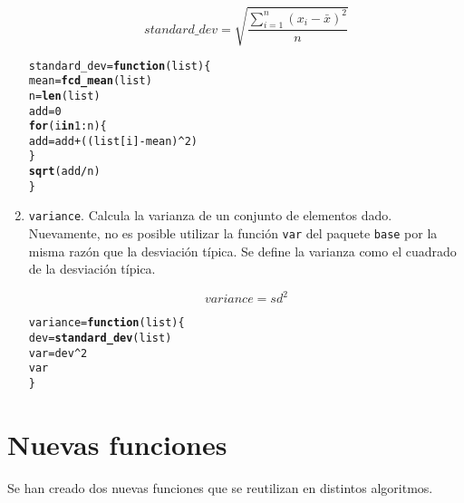 \documentclass[12pt]{report}\usepackage[]{graphicx}\usepackage[dvipsnames]{xcolor}
\makeatletter
\newcommand{\hlnum}[1]{\textcolor[rgb]{0.686,0.059,0.569}{#1}}%
\newcommand{\hlopt}[1]{\textcolor[rgb]{0,0,0}{#1}}%
\newcommand{\hlstd}[1]{\textcolor[rgb]{0.345,0.345,0.345}{#1}}%
\newcommand{\hlkwa}[1]{\textcolor[rgb]{0.161,0.373,0.58}{\textbf{#1}}}%
\newcommand{\hlkwb}[1]{\textcolor[rgb]{0.69,0.353,0.396}{#1}}%
\newcommand{\hlkwc}[1]{\textcolor[rgb]{0.333,0.667,0.333}{#1}}%
\newcommand{\hlkwd}[1]{\textcolor[rgb]{0.737,0.353,0.396}{\textbf{#1}}}%
\newenvironment{kframe}{%
 \def\at@end@of@kframe{}%
 \ifinner\ifhmode%
  \def\at@end@of@kframe{\end{minipage}}%
  \begin{minipage}{\columnwidth}%
 \fi\fi%
 \def\FrameCommand##1{\hskip\@totalleftmargin \hskip-\fboxsep
 \colorbox{shadecolor}{##1}\hskip-\fboxsep
     \hskip-\linewidth \hskip-\@totalleftmargin \hskip\columnwidth}%
 \MakeFramed {\advance\hsize-\width
   \@totalleftmargin\z@ \linewidth\hsize
   \@setminipage}}%
 {\par\unskip\endMakeFramed%
 \at@end@of@kframe}
\newenvironment{knitrout}{}{} %
\makeatother
\begin{document}
\begin{enumerate}
 		$$
 		standard\_dev = \sqrt{\frac{\displaystyle\sum_{i=1}^n (x_i-\bar{x})^2}{n}}
 		$$
 		
\begin{knitrout}
\color{fgcolor}\begin{kframe}
\begin{alltt}
\hlstd{standard_dev} \hlkwb{=} \hlkwa{function}\hlstd{(}\hlkwc{list}\hlstd{) \{}
        \hlstd{mean} \hlkwb{=} \hlkwd{fcd_mean}\hlstd{(list)}
        \hlstd{n} \hlkwb{=} \hlkwd{len}\hlstd{(list)}
        \hlstd{add} \hlkwb{=} \hlnum{0}
        \hlkwa{for} \hlstd{(i} \hlkwa{in} \hlnum{1}\hlopt{:}\hlstd{n) \{}
                \hlstd{add} \hlkwb{=} \hlstd{add} \hlopt{+} \hlstd{((list[i]} \hlopt{-} \hlstd{mean)}\hlopt{^}\hlnum{2}\hlstd{)}
        \hlstd{\}}
        \hlkwd{sqrt}\hlstd{(add}\hlopt{/}\hlstd{n)}
\hlstd{\}}
\end{alltt}
\end{kframe}
\end{knitrout}
 		
 		\item \texttt{variance}. Calcula la varianza de un conjunto de elementos dado. Nuevamente, no es posible utilizar la función \texttt{var} del paquete \texttt{base} por la misma razón que la desviación típica. Se define la varianza como el cuadrado de la desviación típica.
 		
 		$$
 		variance = sd^2
 		$$
 		
\begin{knitrout}
\color{fgcolor}\begin{kframe}
\begin{alltt}
\hlstd{variance} \hlkwb{=} \hlkwa{function}\hlstd{(}\hlkwc{list}\hlstd{) \{}
        \hlstd{dev} \hlkwb{=} \hlkwd{standard_dev}\hlstd{(list)}
        \hlstd{var} \hlkwb{=} \hlstd{dev}\hlopt{^}\hlnum{2}
        \hlstd{var}
\hlstd{\}}
\end{alltt}
\end{kframe}
\end{knitrout}
 		
	 	\end{enumerate}
	 	
	 	\section{Nuevas funciones}
	 	
	 	Se han creado dos nuevas funciones que se reutilizan en distintos algoritmos.
	 	
\end{document}
